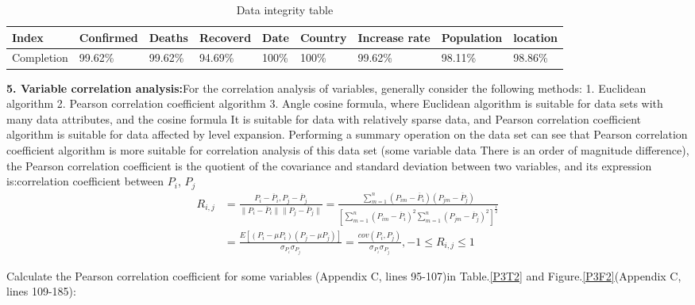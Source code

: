 \documentclass[a4paper, 11pt,twoside=true]{scrartcl}
\begin{document}
\begin{table}[H]
	\centering
	\caption{Data integrity table} \label{P3T1}              %
	\begin{tabular}{lllllllll}
		\hline
		\textbf{Index} & \textbf{Confirmed} & \textbf{Deaths} & \textbf{Recoverd} & \textbf{Date} & \textbf{Country} & \textbf{Increase rate} & \textbf{Population} & \textbf{location} \\ \hline
		Completion         & 99.62\%       & 99.62\%       & 94.69\%       & 100\%         & 100\%         & 99.62\%      & 98.11\%      & 98.86\%      \\ \hline
	\end{tabular}
\end{table}

\noindent \textbf{5. Variable correlation analysis:}For the correlation analysis of variables, generally consider the following methods: 1. Euclidean algorithm 2. Pearson correlation coefficient algorithm 3. Angle cosine formula, where Euclidean algorithm is suitable for data sets with many data attributes, and the cosine formula It is suitable for data with relatively sparse data, and Pearson correlation coefficient algorithm is suitable for data affected by level expansion. Performing a summary operation on the data set can see that Pearson correlation coefficient algorithm is more suitable for correlation analysis of this data set (some variable data There is an order of magnitude difference), the Pearson correlation coefficient is the quotient of the covariance and standard deviation between two variables, and its expression is:correlation coefficient between $P_i$, $P_j$
$$
\begin{aligned}
R_{i,j} & =\frac{P_i-\overline P_i,P_j-\overline P_j}{\|P_i-\overline P_i\|\|P_j-\overline P_j\|}
= \frac{\sum_{m=1}^{n}(P_{im}-\overline P_i)(P_{jm}-\overline P_j)}{\left[ \sum_{m=1}^{n}(P_{im}-\overline P_i)^2 \sum_{m=1}^{n}(P_{jm}-\overline P_j)^2 \right]^{\frac{1}{2}}}\\
& =\frac{E\left[(P_i-\mu P_i)(P_j-\mu P_j)\right]}{\sigma_{P_i}\sigma_{P_j}}
=\frac{cov(P_i,P_j)}{\sigma_{P_i}\sigma_{P_j}}  ,-1\leq R_{i,j}\leq 1
\end{aligned}
$$

\noindent Calculate the Pearson correlation coefficient for some variables (Appendix C, lines 95-107)in Table.\ref{P3T2} and Figure.\ref{P3F2}(Appendix C, lines 109-185):
\end{document}
